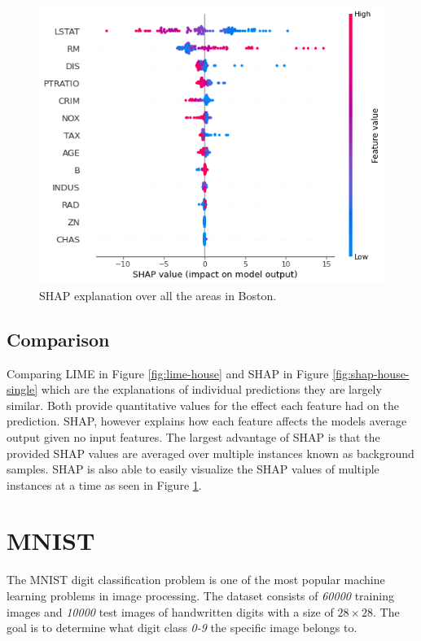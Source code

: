 \begin  {figure}[!htpb]
  \includegraphics[width=\linewidth]{Evaluation_Images/house_shap.png}
  \caption{SHAP explanation over all the areas in Boston.}
  \label{fig:shap-house-entire}
\end{figure}
\subsection{Comparison}
Comparing LIME in Figure \ref{fig:lime-house} and SHAP in Figure \ref{fig:shap-house-single} which are the explanations of individual predictions they are largely similar. Both provide quantitative values for the effect each feature had on the prediction. SHAP, however explains how each feature affects the models average output given no input features. The largest advantage of SHAP is that the provided SHAP values are averaged over multiple instances known as background samples. SHAP is also able to easily visualize the SHAP values of multiple instances at a time as seen in Figure \ref{fig:shap-house-entire}.
\section{MNIST}

The MNIST digit classification problem is one of the most popular machine learning problems in image processing. The dataset consists of \emph{60000} training images and \emph{10000} test images of handwritten digits with a size of $28\times28$. The goal is to determine what digit class \emph{0-9} the specific image belongs to.

